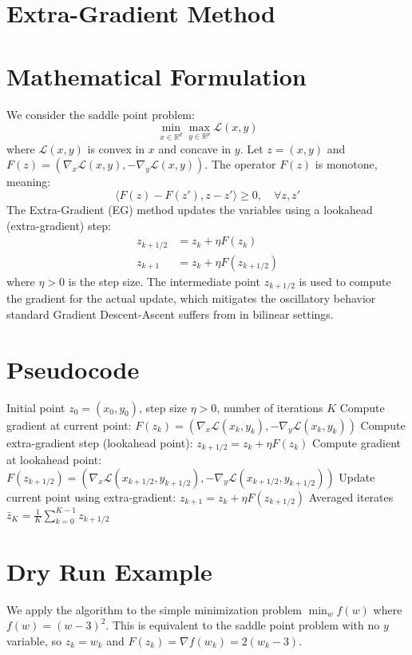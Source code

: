 \documentclass{article}
\begin{document}
\section*{Extra-Gradient Method}
\section*{Mathematical Formulation}
We consider the saddle point problem:
$$
\min_{x \in \mathbb{R}^d} \max_{y \in \mathbb{R}^p} \mathcal{L}(x, y)
$$
where $\mathcal{L}(x, y)$ is convex in $x$ and concave in $y$. Let $z = (x, y)$ and $F(z) = (\nabla_x \mathcal{L}(x, y), -\nabla_y \mathcal{L}(x, y))$. The operator $F(z)$ is monotone, meaning:
$$
\langle F(z) - F(z'), z - z' \rangle \geq 0, \quad \forall z, z'
$$
The Extra-Gradient (EG) method updates the variables using a lookahead (extra-gradient) step:
\begin{align*}
z_{k+1/2} &= z_k + \eta F(z_k) \\
z_{k+1} &= z_k + \eta F(z_{k+1/2})
\end{align*}
where $\eta > 0$ is the step size. The intermediate point $z_{k+1/2}$ is used to compute the gradient for the actual update, which mitigates the oscillatory behavior standard Gradient Descent-Ascent suffers from in bilinear settings.

\section*{Pseudocode}
\begin{algorithm}[H]
\caption{Extra-Gradient Method for Saddle Point Problems}
\begin{algorithmic}[1]
\REQUIRE Initial point $z_0 = (x_0, y_0)$, step size $\eta > 0$, number of iterations $K$
\STATE Compute gradient at current point: $F(z_k) = (\nabla_x \mathcal{L}(x_k, y_k), -\nabla_y \mathcal{L}(x_k, y_k))$
\STATE Compute extra-gradient step (lookahead point): $z_{k+1/2} = z_k + \eta F(z_k)$
\STATE Compute gradient at lookahead point: $F(z_{k+1/2}) = (\nabla_x \mathcal{L}(x_{k+1/2}, y_{k+1/2}), -\nabla_y \mathcal{L}(x_{k+1/2}, y_{k+1/2}))$
\STATE Update current point using extra-gradient: $z_{k+1} = z_k + \eta F(z_{k+1/2})$
\ENDFOR
\RETURN Averaged iterates $\bar{z}_K = \frac{1}{K} \sum_{k=0}^{K-1} z_{k+1/2}$
\end{algorithmic}
\end{algorithm}

\section*{Dry Run Example}
We apply the algorithm to the simple minimization problem $\min_w f(w)$ where $f(w) = (w-3)^2$. This is equivalent to the saddle point problem with no $y$ variable, so $z_k = w_k$ and $F(z_k) = \nabla f(w_k) = 2(w_k - 3)$.
\end{document}
